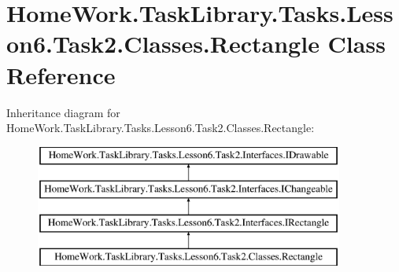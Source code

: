 \hypertarget{class_home_work_1_1_task_library_1_1_tasks_1_1_lesson6_1_1_task2_1_1_classes_1_1_rectangle}{}\section{Home\+Work.\+Task\+Library.\+Tasks.\+Lesson6.\+Task2.\+Classes.\+Rectangle Class Reference}
\label{class_home_work_1_1_task_library_1_1_tasks_1_1_lesson6_1_1_task2_1_1_classes_1_1_rectangle}
Inheritance diagram for Home\+Work.\+Task\+Library.\+Tasks.\+Lesson6.\+Task2.\+Classes.\+Rectangle\+:\begin{figure}[H]
\begin{center}
\leavevmode
\includegraphics[height=4.000000cm]{class_home_work_1_1_task_library_1_1_tasks_1_1_lesson6_1_1_task2_1_1_classes_1_1_rectangle}
\end{center}
\end{figure}
